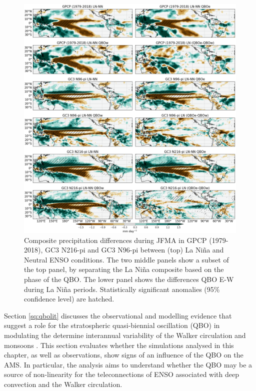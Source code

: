 \begin{figure}[b!]
\includegraphics[width=\linewidth]{figures/trops_qbolnprfma}
\caption[Precipitation anomalies as a function of QBO and ENSO phases]{Composite precipitation differences during JFMA in GPCP (1979-2018), GC3 N216-pi and GC3 N96-pi between (top) La Niña and Neutral ENSO conditions. The two middle panels show a subset of the top panel, by separating the La Niña composite based on the phase of the QBO. The lower panel shows the differences QBO E-W during La Niña periods. Statistically significant anomalies (95\% confidence level) are hatched.}
\label{fig:qbopr_pis}
\end{figure}  

Section \ref{sq:qbolit} discusses the observational and modelling evidence that suggest a role for  the stratospheric quasi-biennial oscillation (QBO) in modulating the determine interannual variability of the Walker circulation and monsoons \citep{giorgetta1999,collimore2003,liess2012}. 
This section evaluates whether the simulations analysed in this chapter, as well as observations, show signs of an influence of the QBO on the AMS. 
In particular, the analysis aims to understand whether the QBO may be a source of non-linearity for the teleconnections of ENSO associated with deep convection and the Walker circulation. %

